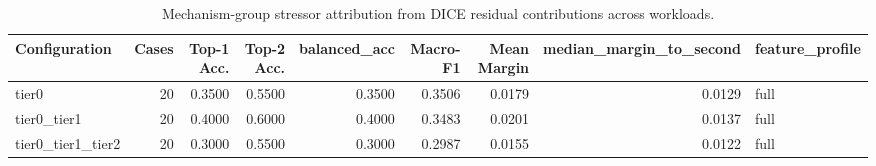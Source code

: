 \begin{table}[t]
\centering
\caption{Mechanism-group stressor attribution from DICE residual contributions across workloads.}
\label{tab:dice_stressor_diagnosis}
\footnotesize
\begin{tabular}{lrrrrrrrl}
\toprule
Configuration & Cases & Top-1 Acc. & Top-2 Acc. & balanced_acc & Macro-F1 & Mean Margin & median_margin_to_second & feature_profile \\
\midrule
tier0 & 20 & 0.3500 & 0.5500 & 0.3500 & 0.3506 & 0.0179 & 0.0129 & full \\
tier0_tier1 & 20 & 0.4000 & 0.6000 & 0.4000 & 0.3483 & 0.0201 & 0.0137 & full \\
tier0_tier1_tier2 & 20 & 0.3000 & 0.5500 & 0.3000 & 0.2987 & 0.0155 & 0.0122 & full \\
\bottomrule
\end{tabular}

\end{table}
